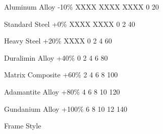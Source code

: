 \documentclass[twoside]{book}
\begin{document}
                      
                       Aluminum Alloy   
                       -10\%   
                       XXXX   
                       XXXX   
                       XXXX   
                       0   
                       20   
                      
                      
                       Standard Steel   
                       +0\%   
                       XXXX   
                       XXXX   
                       0   
                       2   
                       40   
                      
                      
                       Heavy Steel   
                       +20\%   
                       XXXX   
                       0   
                       2   
                       4   
                       60   
                      
                      
                       Duralimin Alloy   
                       +40\%   
                       0   
                       2   
                       4   
                       6   
                       80   
                      
                      
                       Matrix Composite   
                       +60\%   
                       2   
                       4   
                       6   
                       8   
                       100   
                      
                      
                       Adamantite Alloy   
                       +80\%   
                       4   
                       6   
                       8   
                       10   
                       120   
                      
                      
                       Gundanium Alloy   
                       +100\%   
                       6   
                       8   
                       10   
                       12   
                       140   
                      
                    
                  Frame Style  
                  
\end{document}
